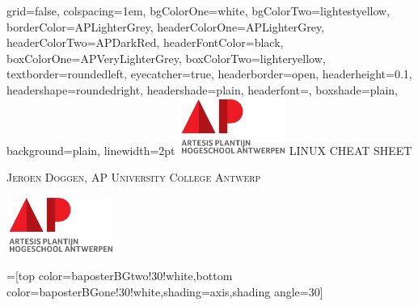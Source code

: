 \documentclass[landscape,final,a0paper]{baposter}
\begin{document}
\newlength{\leftimgwidth}
\begin{poster}%
  {
  grid=false, %
  colspacing=1em, %
  bgColorOne=white,
  bgColorTwo=lightestyellow,
  borderColor=APLighterGrey,
  headerColorOne=APLighterGrey,
  headerColorTwo=APDarkRed,
  headerFontColor=black,
  boxColorOne=APVeryLighterGrey,
  boxColorTwo=lighteryellow,
  textborder=roundedleft,
  eyecatcher=true,
  headerborder=open,
  headerheight=0.1\textheight,
  headershape=roundedright,
  headershade=plain,
  headerfont=\Large\textsf, %
  boxshade=plain,
  background=plain,
  linewidth=2pt
  }
  {
  \includegraphics[height=5em]{AP.png}
  } %
  {\sf %
  LINUX CHEAT SHEET}
  {\sf %
  \vspace{0.05em}
  \textsc{Jeroen Doggen, AP University College Antwerp}


  }
  {
    \includegraphics[height=5em]{AP.png} %
  }

  =[top color=baposterBGtwo!30!white,bottom color=baposterBGone!30!white,shading=axis,shading angle=30]

     \setlength{\leftimgwidth}{0.78em+8.0em}

    \newcommand{\colouredcircle}[1]{%
      \tikz{\useasboundingbox (-0.2em,-0.32em) rectangle(0.2em,0.32em); \draw[draw=black,fill=baposterBGone!80!black!#1!white,line width=0.03em] (0,0) circle(0.18em);}}


\end{poster}
\end{document}
